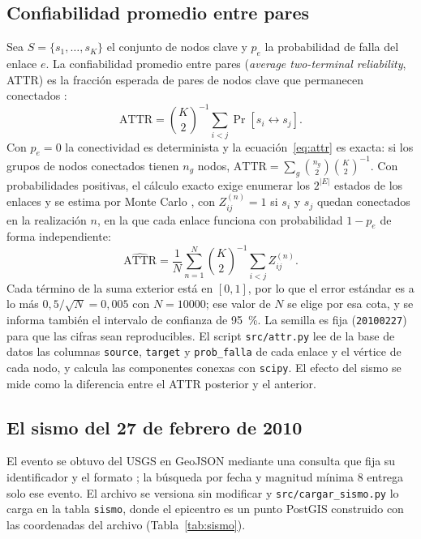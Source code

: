 \documentclass[conference]{IEEEtran}
\newcommand{\attr}{\mathrm{ATTR}}
\begin{document}
\subsection{Confiabilidad promedio entre pares}
Sea $S=\{s_1,\dots,s_K\}$ el conjunto de nodos clave y $p_e$ la probabilidad de falla del enlace $e$.
La confiabilidad promedio entre pares (\emph{average two-terminal reliability}, ATTR) es la fracción esperada de pares de nodos clave que permanecen conectados \cite{rai1990,boettcher2018,neumayer2010}:
\begin{equation}
\attr = \binom{K}{2}^{-1} \sum_{i<j} \Pr\left[ s_i \leftrightarrow s_j \right].
\label{eq:attr}
\end{equation}
Con $p_e=0$ la conectividad es determinista y la ecuación~\eqref{eq:attr} es exacta: si los grupos de nodos conectados tienen $n_g$ nodos, $\attr=\sum_g \binom{n_g}{2}\binom{K}{2}^{-1}$.
Con probabilidades positivas, el cálculo exacto exige enumerar los $2^{|E|}$ estados de los enlaces y se estima por Monte Carlo \cite{boettcher2018}, con $Z_{ij}^{(n)}=1$ si $s_i$ y $s_j$ quedan conectados en la realización $n$, en la que cada enlace funciona con probabilidad $1-p_e$ de forma independiente:
\begin{equation}
\widehat{\attr} = \frac{1}{N}\sum_{n=1}^{N} \binom{K}{2}^{-1} \sum_{i<j} Z_{ij}^{(n)}.
\label{eq:mc}
\end{equation}
Cada término de la suma exterior está en $[0,1]$, por lo que el error estándar es a lo más $0{,}5/\sqrt{N}=0{,}005$ con $N=\num{10000}$; ese valor de $N$ se elige por esa cota, y se informa también el intervalo de confianza de \SI{95}{\percent}.
La semilla es fija (\texttt{20100227}) para que las cifras sean reproducibles.
El script \texttt{src/attr.py} lee de la base de datos las columnas \texttt{source}, \texttt{target} y \texttt{prob\_falla} de cada enlace y el vértice de cada nodo, y calcula las componentes conexas con \texttt{scipy}.
El efecto del sismo se mide como la diferencia entre el ATTR posterior y el anterior.

\subsection{El sismo del 27 de febrero de 2010}
El evento se obtuvo del USGS en GeoJSON mediante una consulta que fija su identificador y el formato \cite{usgs2010maule}; la búsqueda por fecha y magnitud mínima 8 entrega solo ese evento.
El archivo se versiona sin modificar y \texttt{src/cargar\_sismo.py} lo carga en la tabla \texttt{sismo}, donde el epicentro es un punto PostGIS construido con las coordenadas del archivo (Tabla~\ref{tab:sismo}).
\end{document}
